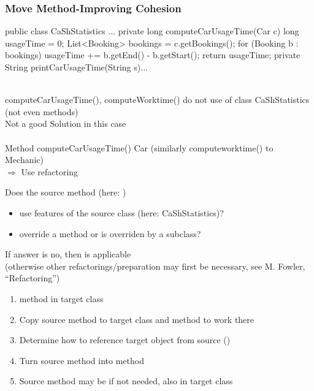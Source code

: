 \subsubsection*{Move Method-Improving Cohesion}
\begin{codeBlock}{}
    public class CaShStatistics{
        ...
        private long computeCarUsageTime(Car c){
            long usageTime = 0;
            List<Booking> bookings = c.getBookings();
            for (Booking b : bookings){
                usageTime += b.getEnd() - b.getStart();
            }
            return usageTime;
        }
        private String printCarUsageTime(String s){...}
    }
\end{codeBlock}
\\
computeCarUsageTime(), computeWorktime() do not use  of class CaShStatistics (not even methods)\\
 Not a good Solution in this case\\
 \\
Method computeCarUsageTime()  Car (similarly computeworktime() to Mechanic)\\
$\Rightarrow$ Use refactoring 
\begin{defBox}[title=Applicability Check for Move Method]
    Does the source method (here: )
    \begin{itemize}
        \item use features of the source class (here: CaShStatistics)?
        \item override a method or is overriden by a subclass?
    \end{itemize}
    If answer is no, then  is applicable\\
    (otherwise other refactorings/preparation may first be necessary, see M. Fowler, \enquote{Refactoring})
\end{defBox}
\begin{defBox}[title=Applying Move Method]
    \begin{enumerate}
        \item {} method in target class
        \item Copy source method to target class and  method to work there
        \item Determine how to reference target object from source ()
        \item Turn source method into  method
        \item Source method may be  if not needed, also  in target class
    \end{enumerate}
\end{defBox}
